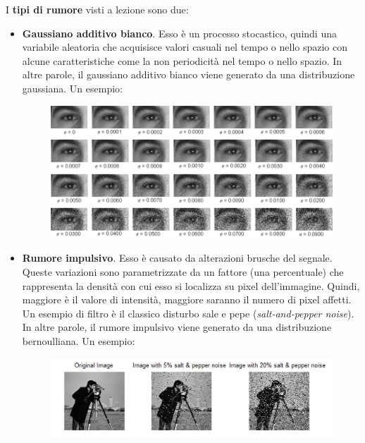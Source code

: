 \documentclass[a4paper]{article}
\begin{document}
	\noindent
	I \textbf{tipi di rumore} visti a lezione sono due:
	\begin{itemize}
		\item \textbf{Gaussiano additivo bianco}. Esso è un processo stocastico, quindi una variabile aleatoria che acquisisce valori casuali nel tempo o nello spazio con alcune caratteristiche come la non periodicità nel tempo o nello spazio.\newline
		In altre parole, il gaussiano additivo bianco viene generato da una distribuzione gaussiana. Un esempio:
		\begin{figure}[!htp]
			\centering
			\includegraphics[width=\textwidth]{img/fig_6.png}
		\end{figure}
		
		\item \textbf{Rumore impulsivo}. Esso è causato da alterazioni brusche del segnale. Queste variazioni sono parametrizzate da un fattore (una percentuale) che rappresenta la densità con cui esso si localizza su pixel dell'immagine. Quindi, maggiore è il valore di intensità, maggiore saranno il numero di pixel affetti. Un esempio di filtro è il classico disturbo sale e pepe (\emph{salt-and-pepper noise}).\newline
		In altre parole, il rumore impulsivo viene generato da una distribuzione bernoulliana. Un esempio:
		\begin{figure}[!htp]
			\centering
			\includegraphics[width=\textwidth]{img/fig_7.png}
		\end{figure}
	\end{itemize}\newpage
	
\end{document}

